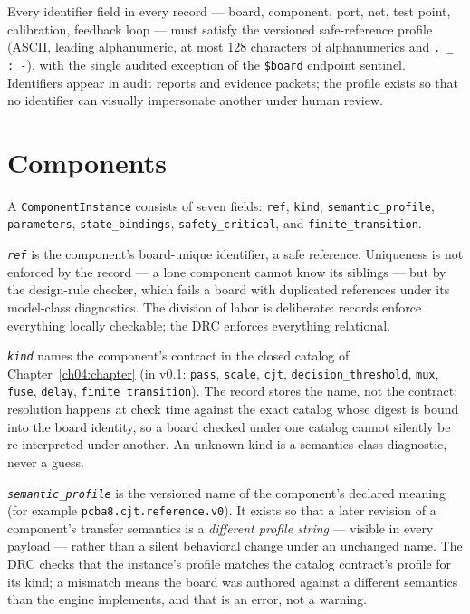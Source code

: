 \begin{ruleenv}\label{ch05:rule:refs}
Every identifier field in every record --- board, component, port, net,
test point, calibration, feedback loop --- must satisfy the versioned
safe-reference profile (ASCII, leading alphanumeric, at most 128
characters of alphanumerics and \texttt{.\ \_ : -}), with the single
audited exception of the \texttt{\$board} endpoint sentinel. Identifiers
appear in audit reports and evidence packets; the profile exists so that
no identifier can visually impersonate another under human review.
\end{ruleenv}

\section{Components}\label{ch05:sec:components}

\begin{definition}\label{ch05:def:component}
A \texttt{ComponentInstance} consists of seven fields:
\texttt{ref}, \texttt{kind}, \texttt{semantic\_profile},
\texttt{parameters}, \texttt{state\_bindings}, \texttt{safety\_critical},
and \texttt{finite\_transition}.
\end{definition}

\emph{\texttt{ref}} is the component's board-unique identifier, a safe
reference. Uniqueness is not enforced by the record --- a lone component
cannot know its siblings --- but by the design-rule checker, which fails
a board with duplicated references under its model-class diagnostics.
The division of labor is deliberate: records enforce everything locally
checkable; the DRC enforces everything relational.

\emph{\texttt{kind}} names the component's contract in the closed catalog
of Chapter~\ref{ch04:chapter} (in v0.1: \texttt{pass}, \texttt{scale},
\texttt{cjt}, \texttt{decision\_threshold}, \texttt{mux}, \texttt{fuse},
\texttt{delay}, \texttt{finite\_transition}). The record stores the name,
not the contract: resolution happens at check time against the exact
catalog whose digest is bound into the board identity, so a board checked
under one catalog cannot silently be re-interpreted under another.
An unknown kind is a semantics-class diagnostic, never a guess.

\emph{\texttt{semantic\_profile}} is the versioned name of the component's
declared meaning (for example \texttt{pcba8.cjt.reference.v0}). It exists
so that a later revision of a component's transfer semantics is a
\emph{different profile string} --- visible in every payload --- rather
than a silent behavioral change under an unchanged name. The DRC checks
that the instance's profile matches the catalog contract's profile for
its kind; a mismatch means the board was authored against a different
semantics than the engine implements, and that is an error, not a
warning.


